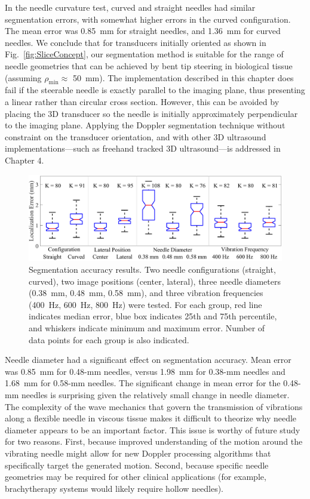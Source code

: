 In the needle curvature test, curved and straight needles had similar segmentation errors, with somewhat higher errors in the curved configuration. The mean error was 0.85~mm for straight needles, and 1.36~mm for curved needles. We conclude that for transducers initially oriented as shown in Fig.~\ref{fig:SliceConcept}, our segmentation method is suitable for the range of needle geometries that can be achieved by bent tip steering in biological tissue (assuming $\rho_{\text{min}} \approx$ 50~mm). The implementation described in this chapter does fail if the steerable needle is exactly parallel to the imaging plane, thus presenting a linear rather than circular cross section. However, this can be avoided by placing the 3D transducer so the needle is initially approximately perpendicular to the imaging plane. Applying the Doppler segmentation technique without constraint on the transducer orientation, and with other 3D ultrasound implementations---such as freehand tracked 3D ultrasound---is addressed in Chapter 4.

\begin{figure}[!t]
\centering
\includegraphics[width=\textwidth]{Images/Chapter2/SegmentationAccuracy/SegmentationAccuracy}%
\caption[Doppler segmentation accuracy results]{Segmentation accuracy results. Two needle configurations (straight, curved), two image positions (center, lateral), three needle diameters (0.38~mm, 0.48~mm, 0.58~mm), and three vibration frequencies (400~Hz, 600~Hz, 800~Hz) were tested. For each group, red line indicates median error, blue box indicates 25th and 75th percentile, and whiskers indicate minimum and maximum error. Number of data points for each group is also indicated.}
\label{fig:SegmentationError}
\end{figure}

Needle diameter had a significant effect on segmentation accuracy. Mean error was 0.85~mm for 0.48-mm needles, versus 1.98~mm for 0.38-mm needles and 1.68~mm for 0.58-mm needles. The significant change in mean error for the 0.48-mm needles is surprising given the relatively small change in needle diameter. The complexity of the wave mechanics that govern the transmission of vibrations along a flexible needle in viscous tissue makes it difficult to theorize why needle diameter appears to be an important factor. This issue is worthy of future study for two reasons. First, because improved understanding of the motion around the vibrating needle might allow for new Doppler processing algorithms that specifically target the generated motion. Second, because specific needle geometries may be required for other clinical applications (for example, brachytherapy systems would likely require hollow needles).

